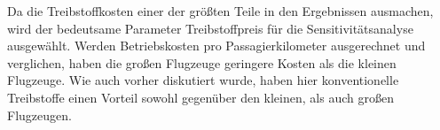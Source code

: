 Da die Treibstoffkosten einer der größten Teile in den Ergebnissen ausmachen, 
wird der bedeutsame Parameter Treibstoffpreis für die Sensitivitätsanalyse ausgewählt.
%
Werden Betriebskosten pro Passagierkilometer ausgerechnet und verglichen, 
haben die großen Flugzeuge geringere Kosten als die kleinen Flugzeuge.
Wie auch vorher diskutiert wurde, haben hier konventionelle Treibstoffe 
einen Vorteil sowohl gegenüber den kleinen, als auch großen Flugzeugen.
